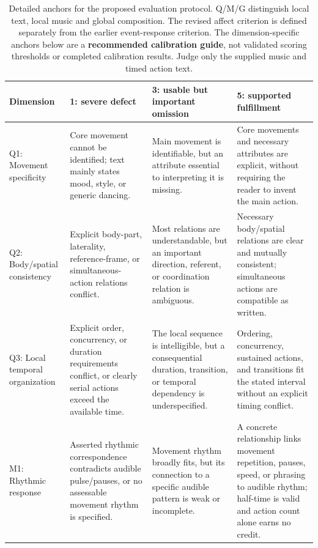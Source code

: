 \begin{table}[!htbp]
\centering
\caption{Detailed anchors for the proposed evaluation protocol. Q/M/G distinguish local text, local music and global composition. The revised affect criterion is defined separately from the earlier event-response criterion. The dimension-specific anchors below are a \textbf{recommended calibration guide}, not validated scoring thresholds or completed calibration results. Judge only the supplied music and timed action text.}
\label{tab:rubric-detailed-anchors}
\begingroup\small
\setlength{\tabcolsep}{4pt}
\renewcommand{\arraystretch}{1.11}
\begin{tabular}{@{}>{\raggedright\arraybackslash}p{}p{}p{}p{}@{}}
\toprule
Dimension & 1: severe defect & 3: usable but important omission & 5: supported fulfillment \\
\midrule
Q1: Movement specificity & Core movement cannot be identified; text mainly states mood, style, or generic dancing. & Main movement is identifiable, but an attribute essential to interpreting it is missing. & Core movements and necessary attributes are explicit, without requiring the reader to invent the main action. \\
\addlinespace
Q2: Body/spatial consistency & Explicit body-part, laterality, reference-frame, or simultaneous-action relations conflict. & Most relations are understandable, but an important direction, referent, or coordination relation is ambiguous. & Necessary body/spatial relations are clear and mutually consistent; simultaneous actions are compatible as written. \\
\addlinespace
Q3: Local temporal organization & Explicit order, concurrency, or duration requirements conflict, or clearly serial actions exceed the available time. & The local sequence is intelligible, but a consequential duration, transition, or temporal dependency is underspecified. & Ordering, concurrency, sustained actions, and transitions fit the stated interval without an explicit timing conflict. \\
\addlinespace
M1: Rhythmic response & Asserted rhythmic correspondence contradicts audible pulse/pauses, or no assessable movement rhythm is specified. & Movement rhythm broadly fits, but its connection to a specific audible pattern is weak or incomplete. & A concrete relationship links movement repetition, pauses, speed, or phrasing to audible rhythm; half-time is valid and action count alone earns no credit. \\

\end{tabular}
\end{table}
